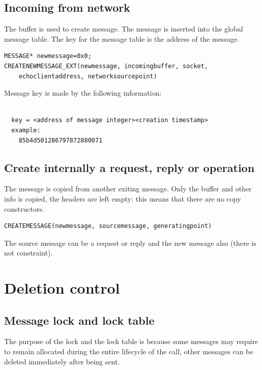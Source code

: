 \documentclass[a4paper]{article}
\begin{document}
\subsection{Incoming from network}

The buffer is used to create message. The message is inserted into the global message table. 
The key for the message table is the address of the message.

\begin{verbatim}
MESSAGE* newmessage=0x0;
CREATENEWMESSAGE_EXT(newmessage, incomingbuffer, socket,
    echoclientaddress, networksourcepoint)
\end{verbatim}

Message key is made by the following information:
\begin{verbatim}

  key = <address of message integer><creation timestamp>
  example:
    85b4d501286797872880071

\end{verbatim}
	
\subsection{Create internally a request, reply or operation}
	
The message is copied from another exiting message. Only the buffer and other info is copied, the headers are left empty; this means that there are no copy constructors.	
	
\begin{verbatim}
CREATEMESSAGE(newmessage, sourcemessage, generatingpoint)
\end{verbatim}

The source message can be a request or reply and the new message also (there is not constraint).

\section{Deletion control}

\subsection{Message lock and lock table}

The purpose of the lock and the lock table is because some messages may require to remain allocated during the entire lifecycle of the call,
other messages can be deleted immediately after being sent.
\end{document}
